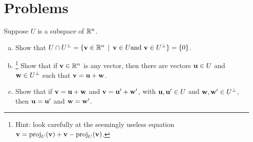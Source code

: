 \section*{Problems}
 

\begin{prob} \label{prob20.1} Suppose $U$ is a subspace of $\mathbb{R}^n$.
\medskip

\begin{enumerate}[a)]
\item  Show that $U \cap U^\perp=\{ \mathbf{v}\in \mathbb{R}^n \,\mid \, \mathbf{v}\in U \text{and } \mathbf{v}\in U^\perp \} =\{0 \}$.
\medskip
%
\item\footnote{Hint: look carefully at the seemingly useless equation $\mathbf{v}= \operatorname{proj}_U(\mathbf{v}) + \mathbf{v}-\operatorname{proj}_U(\mathbf{v})$. } Show that if $\mathbf{v}\in \mathbb{R}^n$ is any vector, then there are vectors $\mathbf{u}\in U$ and $\mathbf{w}\in U^\perp$ such that $\mathbf{v}=\mathbf{u}+\mathbf{w}$.
\medskip
%
\item Show that if $\mathbf{v}=\mathbf{u}+\mathbf{w}$ and $\mathbf{v}=\mathbf{u}'+\mathbf{w}'$, with $\mathbf{u},\mathbf{u}'\in U$ and $\mathbf{w}, \mathbf{w}'\in U^\perp$, then $\mathbf{u}=\mathbf{u}'$ and $\mathbf{w}=\mathbf{w}'$.
\medskip
%
\end{enumerate}

\end{prob} 

 